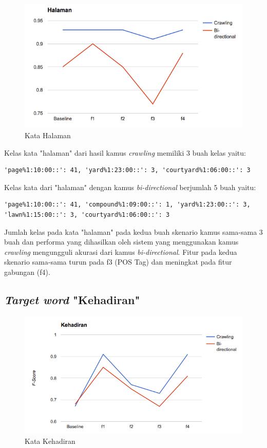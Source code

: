 \begin{figure}
	\centering
	\includegraphics[width=1\linewidth]{adit_pics/halaman.png}
	\caption{Kata Halaman}
	\label{fig:halaman}
\end{figure}

Kelas kata "halaman" dari hasil kamus \textit{crawling} memiliki 3 buah kelas yaitu:
\begin{lstlisting}
'page%1:10:00::': 41, 'yard%1:23:00::': 3, 'courtyard%1:06:00::': 3
\end{lstlisting}
Kelas kata dari "halaman" dengan kamus \textit{bi-directional} berjumlah 5 buah yaitu:
\begin{lstlisting}
'page%1:10:00::': 41, 'compound%1:09:00::': 1, 'yard%1:23:00::': 3, 'lawn%1:15:00::': 3, 'courtyard%1:06:00::': 3
\end{lstlisting}

Jumlah kelas pada kata "halaman" pada kedua buah skenario kamus sama-sama 3 buah dan performa yang dihasilkan oleh sistem yang menggunakan kamus \textit{crawling} mengungguli akurasi dari kamus \textit{bi-directional}. Fitur pada kedua skenario sama-sama turun pada f3 (POS Tag) dan meningkat pada fitur gabungan (f4).

\subsection{\textit{Target word} "Kehadiran"}

\begin{figure}
	\centering
	\includegraphics[width=1\linewidth]{adit_pics/kehadiran.png}
	\caption{Kata Kehadiran}
	\label{fig:kehadiran}
\end{figure}

